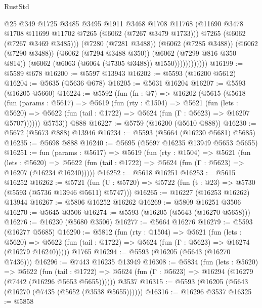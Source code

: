 \begin{lexlean}{RustStd}
\begin{coremodule}
                          @25
                          @349
                          @1725
                          @3485
                          @3495
                          @1911
                          @3468
                          @1708
                          @11768
                          (@11690 @3478 @1708 @11699 @11702 @7265 (@6062 (@7267 @3479 @1733)))
                          @7265
                          (@6062 (@7267 @3469 @3485)))
                        (@7280 (@7281 @3488))
                        (@6062 (@7285 @3488))
                        (@6062 (@7290 @3488))
                        (@6062 (@7294 @3488 @350))
                        (@6062 (@7299 @816 @350 @814))
                        (@6062 (@6063 (@6064 (@7305 @3488)) @1550))))))))))))
@16199 := @5589 @678
@16200 := @5597 @13943
@16202 := @5593 (@16200 @5612)
@16204 := @5635 (@5636 @678)
@16205 := @5631 @16204
@16207 := @5593 (@16205 @5660)
@16224 := @5592
    (fun (fn : @7) =>
    @16202
      (@5615
        (@5618
          (fun (params : @5617) =>
          @5619
            (fun (rty : @1504) =>
            @5621
              (fun (lets : @5620) =>
              @5622 (fun (tail : @1722) => @5624 (fun (Γ : @5623) => @16207 @5707))))))
        @5753))
    @888
@16227 := @5759 (@16200 (@5610 @888))
@16230 := @5672 (@5673 @888) @13946
@16234 := @5593 (@5664 (@16230 @5681) @5685)
@16235 := @5698 @888
@16240 := @5695 (@5697 @16235 @13949 @5653 @5655)
@16251 := fun (params : @5617) =>
  @5619
    (fun (rty : @1504) =>
    @5621
      (fun (lets : @5620) =>
      @5622 (fun (tail : @1722) => @5624 (fun (Γ : @5623) => @16207 (@16234 @16240)))))
@16252 := @5618 @16251
@16253 := @5615 @16252
@16262 := @5721
    (fun (U : @5720) => @5722 (fun (t : @23) => @5730 (@5593 (@5736 @13946 @5611) @5747)))
@16265 := @16227 (@16253 @16262) @13944
@16267 := @5806 @16252 @16262
@16269 := @5809 @16251 @3506
@16270 := @5645 @3506
@16274 := @5593 (@16205 (@5643 (@16270 @5658)))
@16276 := @16230 (@5680 @3506)
@16277 := @5664 @16276
@16279 := @5593 (@16277 @5685)
@16290 := @5812
    (fun (rty : @1504) =>
    @5621
      (fun (lets : @5620) =>
      @5622 (fun (tail : @1722) => @5624 (fun (Γ : @5623) => @16274 (@16279 @16240)))))
    @1765
@16294 := @5593 (@16205 (@5643 (@16270 @7436)))
@16296 := @7443 @16235 @13949
@16308 := @5834
    (fun (lets : @5620) =>
    @5622
      (fun (tail : @1722) =>
      @5624 (fun (Γ : @5623) => @16294 (@16279 (@7442 (@16296 @5653 @5655))))))
    @3537
@16315 := @5593 (@16205 (@5643 (@16270 (@7435 (@5652 (@3538 @5655))))))
@16316 := @16296 @3537
@16325 := @5858

\end{coremodule}
\end{lexlean}
